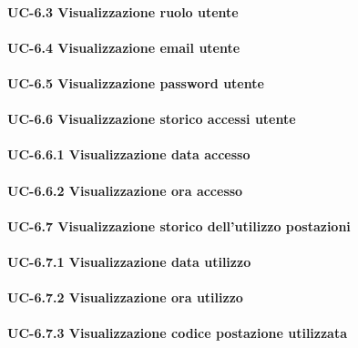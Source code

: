     \paragraph{UC-6.3 Visualizzazione ruolo utente}

    \paragraph{UC-6.4 Visualizzazione email utente}

    \paragraph{UC-6.5 Visualizzazione password utente}

    \paragraph{UC-6.6 Visualizzazione storico accessi utente}

        \paragraph{UC-6.6.1 Visualizzazione data accesso}

        \paragraph{UC-6.6.2 Visualizzazione ora accesso}

    \paragraph{UC-6.7 Visualizzazione storico dell'utilizzo postazioni}

        \paragraph{UC-6.7.1 Visualizzazione data utilizzo}

        \paragraph{UC-6.7.2 Visualizzazione ora utilizzo}

        \paragraph{UC-6.7.3 Visualizzazione codice postazione utilizzata}

